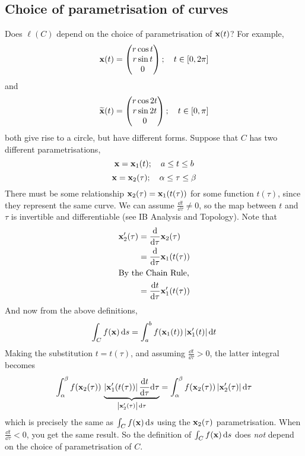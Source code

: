 \subsection{Choice of parametrisation of curves}
Does \(\ell(C)\) depend on the choice of parametrisation of \(\vb x(t)\)?
For example,
\[
	\vb x(t) = \begin{pmatrix}
		r\cos t \\ r \sin t \\ 0
	\end{pmatrix};\quad t \in [0, 2\pi]
\]
and
\[
	\widetilde{\vb x}(t) = \begin{pmatrix}
		r\cos 2t \\ r \sin 2t \\ 0
	\end{pmatrix};\quad t \in [0, \pi]
\]
both give rise to a circle, but have different forms.
Suppose that \(C\) has two different parametrisations,
\[
	\vb x = \vb x_1(t);\quad a \leq t \leq b
\]
\[
	\vb x = \vb x_2(\tau);\quad \alpha \leq \tau \leq \beta
\]
There must be some relationship \(\vb x_2(\tau) = \vb x_1(t(\tau))\) for some function \(t(\tau)\), since they represent the same curve.
We can assume \(\frac{\dd{t}}{\dd \tau} \neq 0\), so the map between \(t\) and \(\tau\) is invertible and differentiable (see IB Analysis and Topology).
Note that
\begin{align*}
	\vb x_2'(\tau) & = \frac{\dd}{\dd \tau}\vb x_2(\tau)        \\
	               & = \frac{\dd}{\dd \tau}\vb x_1(t(\tau))     \\
	\intertext{By the Chain Rule,}
	               & = \frac{\dd{t}}{\dd \tau}\vb x_1'(t(\tau))
\end{align*}
And now from the above definitions,
\[
	\int_C f(\vb x) \dd{s} = \int_a^b f(\vb x_1(t)) \, \abs{\vb x_1'(t)} \dd{t}
\]
Making the substitution \(t = t(\tau)\), and assuming \(\frac{\dd{t}}{\dd \tau} > 0\), the latter integral becomes
\[
	\int_\alpha^\beta f(\vb x_2(\tau)) \, \underbrace{\abs{\vb x_1'(t(\tau))} \,\frac{\dd{t}}{\dd \tau}\dd \tau}_{\abs{\vb x_2'(\tau)}\,\dd \tau} = \int_\alpha^\beta f(\vb x_2(\tau)) \, \abs{\vb x_2'(\tau)} \,\dd \tau
\]
which is precisely the same as \(\int_C f(\vb x) \dd{s}\) using the \(\vb x_2(\tau)\) parametrisation.
When \(\frac{\dd{t}}{\dd \tau} < 0\), you get the same result.
So the definition of \(\int_C f(\vb x) \dd{s}\) does \textit{not} depend on the choice of parametrisation of \(C\).
